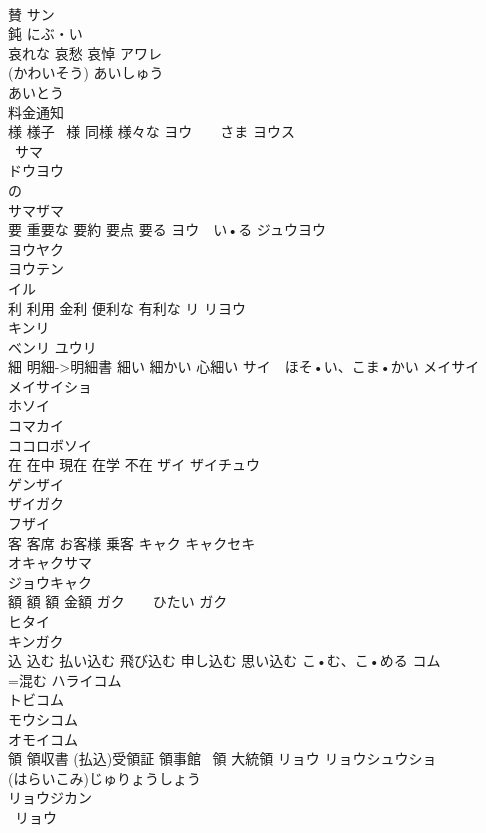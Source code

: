 \documentclass[8pt]{extreport}
\begin{document}
\begin{CJK}{UTF8}{min}
\\	賛	サン
\\	鈍	にぶ・い
\\	哀れな 哀愁 哀悼	アワレ 
\\	(かわいそう) あいしゅう　
\\	あいとう
\\	料金通知	
\\	様 様子 ~様 同様 様々な	ヨウ　　さま ヨウス
\\	~サマ
\\	ドウヨウ 
\\	の
\\	サマザマ
\\	要 重要な 要約 要点 要る	ヨウ　い•る ジュウヨウ 
\\	ヨウヤク
\\	ヨウテン
\\	イル
\\	利 利用 金利 便利な 有利な	リ リヨウ 
\\	キンリ 
\\	ベンリ ユウリ 
\\	細 明細->明細書 細い 細かい 心細い	サイ　ほそ•い、こま•かい メイサイ
\\	メイサイショ
\\	ホソイ
\\	コマカイ
\\	ココロボソイ
\\	在 在中 現在 在学 不在	ザイ ザイチュウ
\\	ゲンザイ
\\	ザイガク
\\	フザイ
\\	客 客席 お客様 乗客	キャク キャクセキ
\\	オキャクサマ
\\	ジョウキャク
\\	額 額 額 金額	ガク　　ひたい ガク
\\	ヒタイ
\\	キンガク
\\	込 込む 払い込む 飛び込む 申し込む 思い込む	こ•む、こ•める コム　
\\	=混む ハライコム
\\	トビコム
\\	モウシコム
\\	オモイコム
\\	領 領収書 (払込)受領証 領事館 ~領 大統領	リョウ リョウシュウショ
\\	(はらいこみ)じゅりょうしょう 
\\	リョウジカン
\\	~リョウ

\end{CJK}
\end{document}
